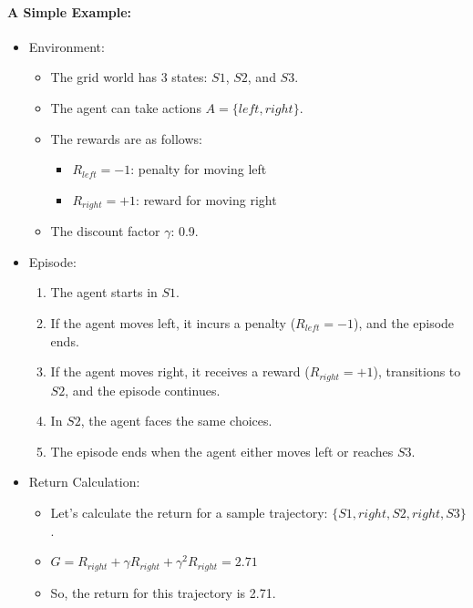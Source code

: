 \paragraph{A Simple Example:}
\begin{itemize}
	\item Environment:
		\begin{itemize}
			\item The grid world has 3 states: $S1$, $S2$, and $S3$.
			\item The agent can take actions $A=\{left,right\}$.
			\item The rewards are as follows:
				\begin{itemize}
					\item $R_{left}=−1$: penalty for moving left
					\item $R_{right}=+1$: reward for moving right
				\end{itemize}
			\item The discount factor $\gamma$: 0.9.
		\end{itemize}
	\item Episode:
		\begin{enumerate}
			\item The agent starts in $S1$.
			\item If the agent moves left, it incurs a penalty ($R_{left}=−1$), and the episode ends.
			\item If the agent moves right, it receives a reward ($R_{right}=+1$), transitions to $S2$, and the episode continues.
			\item In $S2$, the agent faces the same choices.
			\item The episode ends when the agent either moves left or reaches $S3$.
		\end{enumerate}
	\item Return Calculation:
		\begin{itemize}
			\item Let's calculate the return for a sample trajectory: $\{S1,right,S2,right,S3\}$.
			\item $G=R_{right}+\gamma R_{right}+\gamma^2R_{right}=2.71$ 
			\item So, the return for this trajectory is 2.71.
		\end{itemize}
\end{itemize}

